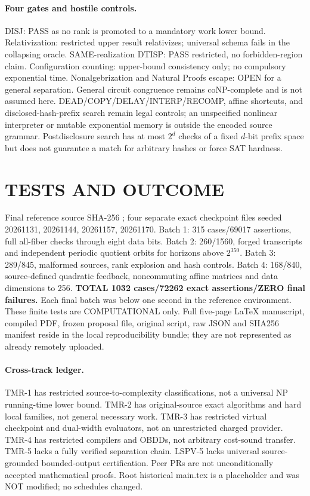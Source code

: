 \documentclass[11pt]{article}
\begin{document}
\paragraph{Four gates and hostile controls.}
DISJ: PASS as no rank is promoted to a mandatory work lower bound. Relativization: restricted upper result relativizes; universal schema fails in the collapsing oracle. SAME-realization DTISP: PASS restricted, no forbidden-region claim. Configuration counting: upper-bound consistency only; no compulsory exponential time. Nonalgebrization and Natural Proofs escape: OPEN for a general separation. General circuit congruence remains coNP-complete and is not assumed here. DEAD/COPY/DELAY/INTERP/RECOMP, affine shortcuts, and disclosed-hash-prefix search remain legal controls; an unspecified nonlinear interpreter or mutable exponential memory is outside the encoded source grammar. Postdisclosure search has at most $2^d$ checks of a fixed $d$-bit prefix space but does not guarantee a match for arbitrary hashes or force SAT hardness.

\section{TESTS AND OUTCOME}
Final reference source SHA-256 ; four separate exact checkpoint files seeded 20261131, 20261144, 20261157, 20261170. Batch 1: 315 cases/69017 assertions, full all-fiber checks through eight data bits. Batch 2: 260/1560, forged transcripts and independent periodic quotient orbits for horizons above $2^{350}$. Batch 3: 289/845, malformed sources, rank explosion and hash controls. Batch 4: 168/840, source-defined quadratic feedback, noncommuting affine matrices and data dimensions to 256. \textbf{TOTAL 1032 cases/72262 exact assertions/ZERO final failures.} Each final batch was below one second in the reference environment. These finite tests are COMPUTATIONAL only. Full five-page LaTeX manuscript, compiled PDF, frozen proposal file, original script, raw JSON and SHA256 manifest reside in the local reproducibility bundle; they are not represented as already remotely uploaded.
\paragraph{Cross-track ledger.} TMR-1 has restricted source-to-complexity classifications, not a universal NP running-time lower bound. TMR-2 has original-source exact algorithms and hard local families, not general necessary work. TMR-3 has restricted virtual checkpoint and dual-width evaluators, not an unrestricted charged provider. TMR-4 has restricted compilers and OBDDs, not arbitrary cost-sound transfer. TMR-5 lacks a fully verified separation chain. LSPV-5 lacks universal source-grounded bounded-output certification. Peer PRs are not unconditionally accepted mathematical proofs. Root historical main.tex is a placeholder and was NOT modified; no schedules changed.
\end{document}
